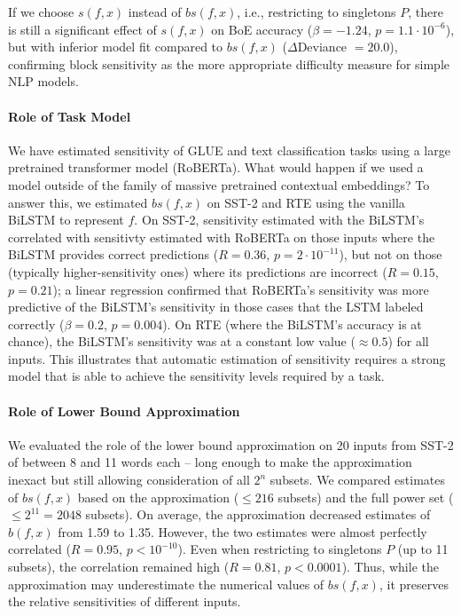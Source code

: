 \documentclass[11pt,a4paper]{article}
\begin{document}
If we choose $s(f,x)$ instead of $bs(f,x)$, i.e., restricting to singletons $P$, there is still a significant effect of $s(f,x)$ on BoE accuracy ($\beta=-1.24$, $p=1.1\cdot 10^{-6}$), but with inferior model fit compared to $bs(f,x)$ ($\Delta$Deviance $=20.0$), confirming block sensitivity as the more appropriate difficulty measure for simple NLP models.


\paragraph{Role of Task Model}
We have estimated sensitivity of GLUE and text classification tasks using a large pretrained transformer model (RoBERTa).
What would happen if we used a model outside of the family of massive pretrained contextual embeddings?
To answer this, we estimated $bs(f,x)$ on SST-2 and RTE using the vanilla BiLSTM to represent $f$.
On SST-2, sensitivity estimated with the BiLSTM's correlated with sensitivty estimated with RoBERTa on those inputs where the BiLSTM provides correct predictions ($R=0.36$, $p=2 \cdot 10^{-11}$), but not on those (typically higher-sensitivity ones) where its predictions are incorrect ($R=0.15$, $p=0.21$); a linear regression confirmed that RoBERTa's sensitivity was more predictive of the BiLSTM's sensitivity in those cases that the LSTM labeled correctly ($\beta=0.2$, $p=0.004$).
On RTE (where the BiLSTM's accuracy is at chance), the BiLSTM's sensitivity was at a constant low value ($\approx 0.5$) for all inputs.
This illustrates that automatic estimation of sensitivity requires a strong model that is able to achieve the sensitivity levels required by a task.


\paragraph{Role of Lower Bound Approximation}
We evaluated the role of the lower bound approximation on 20 inputs from SST-2 of between 8 and 11 words each -- long enough to make the approximation inexact but still allowing consideration of all $2^n$ subsets. %
We compared estimates of $bs(f,x)$ based on the approximation ($\leq 216$ subsets) and the full power set ($\leq 2^{11} = 2048$ subsets).
On average, the approximation decreased estimates of $b(f,x)$ from 1.59 to 1.35.
However, the two estimates were almost perfectly correlated ($R=0.95$, $p<10^{-10}$).
Even when restricting to singletons $P$ (up to 11 subsets), the correlation remained high ($R=0.81$, $p<0.0001$). 
Thus, while the approximation may underestimate the numerical values of $bs(f,x)$, it preserves the relative sensitivities of different inputs.
\end{document}
